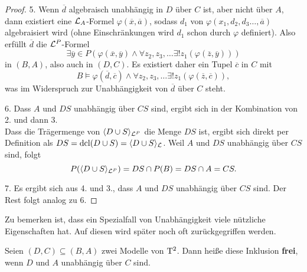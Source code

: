 \begin{proof}
	\item[5.] Wenn $\overline{d}$ algebraisch unabhängig in $D$ über $C$ ist, aber nicht über $A$, dann existiert eine $\mathcal{L}_A$-Formel $\varphi(\overline{x},\overline{a})$, sodass $d_1$ von $\varphi(x_1,d_2,d_3\dots,\overline{a})$ algebraisiert wird (ohne Einschränkungen wird $d_1$ schon durch $\varphi$ definiert). Also erfüllt $\overline{d}$ die $\mathcal{L}^P$-Formel $$\exists \overline{y}\in P(\varphi(\overline{x},\overline{y})\land\forall z_2,z_3,\dots\exists! z_1(\varphi(\overline{z},\overline{y})))$$ in $(B,A)$, also auch in $(D,C)$. Es existiert daher ein Tupel $\overline{c}$ in $C$ mit $$B\models\varphi(\overline{d},\overline{c})\land\forall z_2,z_3,\dots\exists! z_1(\varphi(\overline{z},\overline{c})),$$ was im Widerspruch zur Unabhängigkeit von $\overline{d}$ über $C$ steht.
	\item[6.] Dass $A$ und $DS$ unabhängig über $CS$ sind, ergibt sich in der Kombination von 2. und dann 3.\\
	Dass die Trägermenge von $\langle D\cup S\rangle_{\mathcal{L}^P}$ die Menge $DS$ ist, ergibt sich direkt per Definition als $DS=\operatorname{dcl}(D\cup S)=\langle D\cup S\rangle_{\mathcal{L}}$. Weil $A$ und $DS$ unabhängig über $CS$ sind, folgt $$P(\langle D\cup S\rangle_{\mathcal{L}^P})=DS\cap P(B)=DS\cap A=CS.$$
	\item[7.] Es ergibt sich aus 4. und 3., dass $A$ und $DS$ unabhängig über $CS$ sind. Der Rest folgt analog zu 6.
\end{proof}

Zu bemerken ist, dass ein Spezialfall von Unabhängigkeit viele nützliche Eigenschaften hat. Auf diesen wird später noch oft zurückgegriffen werden.
\begin{definition}
	Seien $(D,C)\subseteq(B,A)$ zwei Modelle von $\operatorname{T^2}$. Dann heiße diese Inklusion \textbf{frei}, wenn $D$ und $A$ unabhängig über $C$ sind.
\end{definition}

